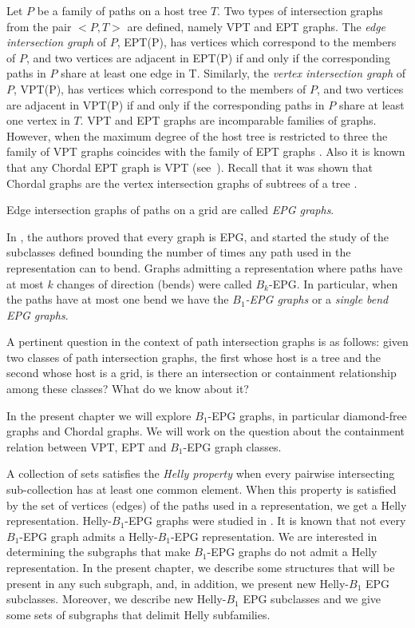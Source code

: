  Let $P$ be a family of paths on a host tree $T$. Two types of intersection graphs from the pair $<P,T>$ are defined, namely VPT and EPT graphs.
The \textit{edge intersection graph} of $P$, EPT(P), has vertices which correspond to the members of $P$, and two vertices are adjacent in EPT(P) if and only if the corresponding paths in $P$ share at least one edge in T. Similarly, the \textit{vertex intersection graph} of $P$, VPT(P), has vertices which correspond to the members of $P$, and two vertices are adjacent in VPT(P) if and only if the corresponding paths in $P$ share at least one vertex in $T$.
%
VPT and EPT graphs are incomparable families of graphs. However, when the maximum degree of the host tree is restricted to three the family of
VPT graphs coincides with the family of EPT graphs \cite{golumbic1985edge%
}. Also it is known that any Chordal EPT graph is VPT (see~\cite{syslo1985triangulated}). Recall that it was shown that Chordal graphs are the vertex intersection graphs of subtrees of a tree \cite{gavril1974intersection}.


Edge intersection graphs of paths on a grid are called \textit{EPG graphs}. 

In \citeauthor{golumbic2009} \cite{golumbic2009}, the authors proved that every graph is EPG, and started the study of the subclasses
defined bounding the number of times any path used in the representation can to bend.  Graphs admitting a representation
where  paths  have at most $k$ changes of direction  (bends) were called $B_k$-EPG. 
 In particular, when the paths have at most one bend we have the \textit{ $B_1$-EPG graphs} or a \textit{single bend EPG graphs}.

 A pertinent question in the context of path intersection graphs is as follows: given two classes of path intersection graphs,
 the first whose host is a tree and the second whose host is a grid,  is there an intersection or containment relationship among these classes? What do we know about it?

In the present chapter we will explore $B_1$-EPG graphs, in particular diamond-free graphs and Chordal graphs. We will work on the question about the containment relation between  VPT, EPT and $B_1$-EPG graph classes.


 A collection  of sets satisfies the \textit{Helly property} when every pairwise intersecting sub-collection  has at least one common element. When this property
 is satisfied by the set of vertices (edges) of the paths used in a representation, we get a Helly representation.  Helly-$B_1$-EPG graphs were studied
 in \cite{bornstein2019, dmtcs:6506}.                                     
It is known that not every $B_1$-EPG graph admits a Helly-$B_1$-EPG representation. We are interested in determining the subgraphs that make
$B_1$-EPG graphs do not admit a Helly representation. In the present chapter, we describe some structures that will be present in any such subgraph,
and, in addition, we present new  Helly-$B_1$ EPG  subclasses.
Moreover,  we  describe new  Helly-$B_1$ EPG  subclasses %
and we give some sets of subgraphs that delimit Helly subfamilies.   
